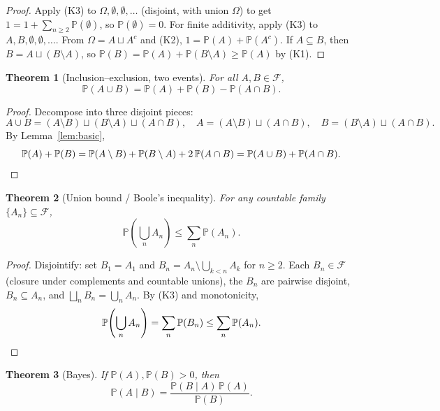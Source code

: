 \documentclass[11pt]{article}
\newtheorem{theorem}{Theorem}[section]
\theoremstyle{remark}
\begin{document}
\begin{proof}
Apply (K3) to $\Omega, \emptyset, \emptyset, \ldots$ (disjoint, with union $\Omega$) to get $1 = 1 + \sum_{n \geq 2} \mathbb{P}(\emptyset)$, so $\mathbb{P}(\emptyset) = 0$. For finite additivity, apply (K3) to $A, B, \emptyset, \emptyset, \ldots$. From $\Omega = A \sqcup A^{c}$ and (K2), $1 = \mathbb{P}(A) + \mathbb{P}(A^{c})$. If $A \subseteq B$, then $B = A \sqcup (B \setminus A)$, so $\mathbb{P}(B) = \mathbb{P}(A) + \mathbb{P}(B \setminus A) \geq \mathbb{P}(A)$ by (K1).
\end{proof}

\begin{theorem}[Inclusion--exclusion, two events]
For all $A, B \in \mathcal{F}$,
\[
  \mathbb{P}(A \cup B) = \mathbb{P}(A) + \mathbb{P}(B) - \mathbb{P}(A \cap B).
\]
\end{theorem}

\begin{proof}
Decompose into three disjoint pieces:
\[
  A \cup B = (A \setminus B) \sqcup (B \setminus A) \sqcup (A \cap B), \quad A = (A \setminus B) \sqcup (A \cap B), \quad B = (B \setminus A) \sqcup (A \cap B).
\]
By Lemma~\ref{lem:basic},
\[
  \mathbb{P}(A) + \mathbb{P}(B) = \mathbb{P}(A \setminus B) + \mathbb{P}(B \setminus A) + 2\,\mathbb{P}(A \cap B) = \mathbb{P}(A \cup B) + \mathbb{P}(A \cap B). \qedhere
\]
\end{proof}

\begin{theorem}[Union bound / Boole's inequality]
For any countable family $\{A_{n}\} \subseteq \mathcal{F}$,
\[
  \mathbb{P}\!\left(\bigcup_{n} A_{n}\right) \leq \sum_{n} \mathbb{P}(A_{n}).
\]
\end{theorem}

\begin{proof}
Disjointify: set $B_{1} = A_{1}$ and $B_{n} = A_{n} \setminus \bigcup_{k < n} A_{k}$ for $n \geq 2$. Each $B_{n} \in \mathcal{F}$ (closure under complements and countable unions), the $B_{n}$ are pairwise disjoint, $B_{n} \subseteq A_{n}$, and $\bigsqcup_{n} B_{n} = \bigcup_{n} A_{n}$. By (K3) and monotonicity,
\[
  \mathbb{P}\!\left(\bigcup_{n} A_{n}\right) = \sum_{n} \mathbb{P}(B_{n}) \leq \sum_{n} \mathbb{P}(A_{n}). \qedhere
\]
\end{proof}

\begin{theorem}[Bayes]
If $\mathbb{P}(A), \mathbb{P}(B) > 0$, then
\[
  \mathbb{P}(A \mid B) = \frac{\mathbb{P}(B \mid A)\,\mathbb{P}(A)}{\mathbb{P}(B)}.
\]
\end{theorem}
\end{document}
